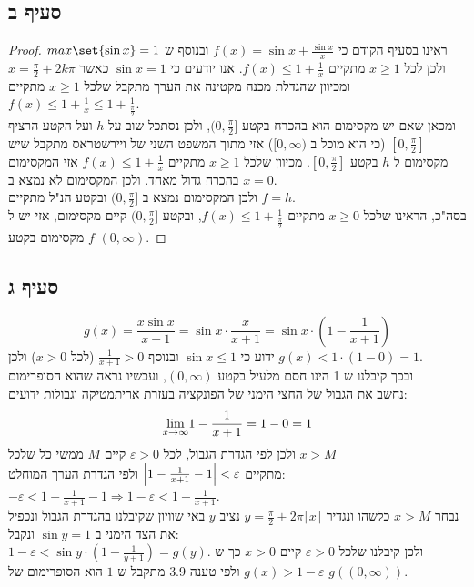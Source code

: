 \documentclass{article}
\DeclarePairedDelimiter\set\{\}
\begin{document}
	\subsection*{סעיף ב}
	\begin{proof}
		ראינו בסעיף הקודם כי $f(x) = \sin x + \frac{\sin x}{x}$
		ובנוסף ש $max\set{\sin x} = 1$ ולכן לכל $x \geq 1$ מתקיים $f(x) \leq 1 + \frac{1}{x}$.
		אנו יודעים כי $\sin x = 1$ כאשר $x = \frac{\pi}{2} + 2k\pi$
		ומכיוון שהגדלת מכנה מקטינה את הערך מתקבל שלכל $x \geq 1$ מתקיים $f(x) \leq 1 + \frac{1}{x} \leq 1 + \frac{1}{\frac{\pi}{2}}$. \\
		ומכאן שאם יש מקסימום הוא בהכרח בקטע $(0, \frac{\pi}{2}]$, ולכן נסתכל שוב על $h$ ועל הקטע הרציף $[0, \frac{\pi}{2}]$ (כי הוא מוכל ב $[0, \infty)$) אזי מתוך המשפט השני של ויירשטראס מתקבל שיש מקסימום ל $h$ בקטע $[0, \frac{\pi}{2}]$.
		מכיוון שלכל $x \geq 1$ מתקיים $f(x) \leq 1 + \frac{1}{x}$ אזי המקסימום בהכרח גדול מאחד. ולכן המקסימום לא נמצא ב $x=0$. \\
		ולכן המקסימום נמצא ב $(0, \frac{\pi}{2}]$ ובקטע הנ"ל מתקיים $f=h$. \\
		בסה"כ, הראינו שלכל $x \geq 0$ מתקיים $f(x) \leq 1 + \frac{1}{\frac{\pi}{2}}$, ובקטע $(0, \frac{\pi}{2}]$ קיים מקסימום, אזי יש ל $f$ מקסימום בקטע $(0, \infty)$.
	\end{proof}

	\subsection*{סעיף ג}
	\[
	g(x) = \frac{x \sin x}{x+1} = \sin x \cdot \frac{x}{x+1} = \sin x \cdot (1 - \frac{1}{x+1})
	\]
	ידוע כי $\sin x \leq 1$ ובנוסף $\frac{1}{x+1} > 0$ (לכל $x>0$) ולכן $g(x) < 1 \cdot (1-0) = 1$. \\
	ובכך קיבלנו ש 1 הינו חסם מלעיל בקטע $(0, \infty)$, ועכשיו נראה שהוא הסופרימום\\

	נחשב את הגבול של החצי הימני של הפונקציה בעזרת אריתמטיקה וגבולות ידועים:
	\[
	\displaystyle{\lim_{x \to \infty}} 1 - \frac{1}{x+1} = 1 - 0 = 1
	\]
	ולכן לפי הגדרת הגבול, לכל $\varepsilon > 0$ קיים $M$ ממשי כל שלכל $x > M$ \\
	 מתקיים
	 $\left| 1 - \frac{1}{x+1} - 1 \right| < \varepsilon$ ולפי הגדרת הערך המוחלט: \\
	$-\varepsilon < 1 - \frac{1}{x+1} - 1 \Rightarrow 1 - \varepsilon < 1 - \frac{1}{x+1}$. \\
	נבחר $x > M$ כלשהו ונגדיר  $y = \frac{\pi}{2} + 2\pi \lceil x \rceil$
	נציב $y$ באי שוויון שקיבלנו בהגדרת הגבול ונכפיל את הצד הימני ב $\sin y = 1$ ונקבל: \\
	$1 - \varepsilon < \sin y \cdot (1 - \frac{1}{y+1}) = g(y)$.
	ולכן קיבלנו שלכל $\varepsilon > 0$ קיים $x > 0$ כך ש $g(x) > 1 -\varepsilon$ ולפי טענה 3.9 מתקבל ש $1$ הוא הסופרימום של $g((0, \infty))$.
\end{document}
